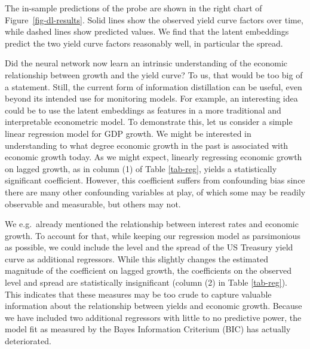 \documentclass{article}
\theoremstyle{plain}
\theoremstyle{definition}
\theoremstyle{remark}
\begin{document}
The in-sample predictions of the probe are shown in the right chart of Figure~\ref{fig-dl-results}. Solid lines show the observed yield curve factors over time, while dashed lines show predicted values. We find that the latent embeddings predict the two yield curve factors reasonably well, in particular the spread. %

Did the neural network now learn an intrinsic understanding of the economic relationship between growth and the yield curve? To us, that would be too big of a statement. Still, the current form of information distillation can be useful, even beyond its intended use for monitoring models.
For example, an interesting idea could be to use the latent embeddings as features in a more traditional and interpretable econometric model. To demonstrate this, let us consider a simple linear regression model for GDP growth. We might be interested in understanding to what degree economic growth in the past is associated with economic growth today. As we might expect, linearly regressing economic growth on lagged growth, as in column (1) of Table \ref{tab-reg}, yields a statistically significant coefficient. However, this coefficient suffers from confounding bias since there are many other confounding variables at play, of which some may be readily observable and measurable, but others may not.


We e.g.\ already mentioned the relationship between interest rates and economic growth. To account for that, while keeping our regression model as parsimonious as possible, we could include the level and the spread of the US Treasury yield curve as additional regressors. While this slightly changes the estimated magnitude of the coefficient on lagged growth, the coefficients on the observed level and spread are statistically insignificant (column (2) in Table \ref{tab-reg}). This indicates that these measures may be too crude to capture valuable information about the relationship between yields and economic growth. Because we have included two additional regressors with little to no predictive power, the model fit as measured by the Bayes Information Criterium (BIC) has actually deteriorated.
\end{document}
